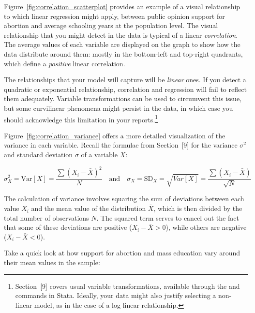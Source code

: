   Figure~\ref{fig:correlation_scatterplot} provides an example of a visual relationship to which linear regression might apply, between public opinion support for abortion and average schooling years at the population level. The visual relationship that you might detect in the data is typical of a linear \emph{correlation}. The average values of each variable are displayed on the graph to show how the data distribute around them: mostly in the bottom-left and top-right quadrants, which define a \emph{positive} linear correlation.%

  The relationships that your model will capture will be \emph{linear} ones. If you detect a quadratic or exponential relationship, correlation and regression will fail to reflect them adequately. Variable transformations can be used to circumvent this issue, but some curvilinear phenomena might persist in the data, in which case you should acknowledge this limitation in your reports.\footnote{Section~[9] covers usual variable transformations, available through the  and  commands in Stata. Ideally, your data might also justify selecting a non-linear model, as in the case of a log-linear relationship.}%

  Figure~\ref{fig:correlation_variance} offers a more detailed visualization of the variance in each variable. Recall the formulae from Section~[9] for the variance $\sigma^2$ and standard deviation $\sigma$ of a variable $X$: %

  $$\sigma^2_X = \text{Var}[X] = \frac{\sum (X_i - \bar X)^2}{N} \quad \text{and} \quad \sigma_X = \text{SD}_X = \sqrt{Var[X]} = \frac{\sum (X_i - \bar X)}{\sqrt{N}}$$%

  The calculation of variance involves squaring the sum of deviations between each value $X_i$ and the mean value of the distribution $\bar X$, which is then divided by the total number of observations $N$. The squared term serves to cancel out the fact that some of these deviations are positive ($X_i - \bar X > 0$), while others are negative ($X_i - \bar X < 0$).%

  Take a quick look at how support for abortion and mass education vary around their mean values in the sample:

